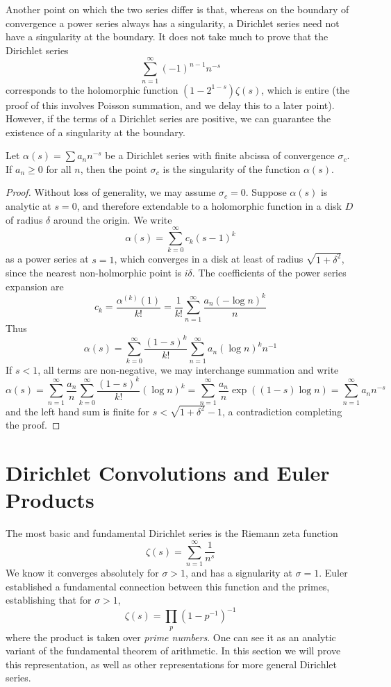 Another point on which the two series differ is that, whereas on the boundary of convergence a power series always has a singularity, a Dirichlet series need not have a singularity at the boundary. It does not take much to prove that the Dirichlet series
%
\[ \sum_{n = 1}^\infty (-1)^{n-1} n^{-s} \]
%
corresponds to the holomorphic function $(1 - 2^{1-s}) \zeta(s)$, which is entire (the proof of this involves Poisson summation, and we delay this to a later point). However, if the terms of a Dirichlet series are positive, we can guarantee the existence of a singularity at the boundary.

\begin{theorem}[Landau]
    Let $\alpha(s) = \sum a_n n^{-s}$ be a Dirichlet series with finite abcissa of convergence $\sigma_c$. If $a_n \geq 0$ for all $n$, then the point $\sigma_c$ is the singularity of the function $\alpha(s)$.
\end{theorem}
\begin{proof}
    Without loss of generality, we may assume $\sigma_c = 0$. Suppose $\alpha(s)$ is analytic at $s = 0$, and therefore extendable to a holomorphic function in a disk $D$ of radius $\delta$ around the origin. We write
    \[ \alpha(s) = \sum_{k = 0}^\infty c_k (s - 1)^k \]
    as a power series at $s = 1$, which converges in a disk at least of radius $\sqrt{1 + \delta^2}$, since the nearest non-holmorphic point is $i \delta$. The coefficients of the power series expansion are
    \[ c_k = \frac{\alpha^{(k)}(1)}{k!} = \frac{1}{k!} \sum_{n = 1}^\infty \frac{a_n (- \log n)^k}{n} \]
    Thus
    \[ \alpha(s) = \sum_{k = 0}^\infty \frac{(1 - s)^k}{k!} \sum_{n = 1}^\infty a_n (\log n)^k n^{-1} \]
    If $s < 1$, all terms are non-negative, we may interchange summation and write
    \[ \alpha(s) = \sum_{n = 1}^\infty \frac{a_n}{n} \sum_{k = 0}^\infty \frac{(1 - s)^k}{k!} (\log n)^k = \sum_{n = 1}^\infty \frac{a_n}{n} \exp((1 - s) \log n) = \sum_{n = 1}^\infty a_n n^{-s} \]
    and the left hand sum is finite for $s < \sqrt{1 + \delta^2} - 1$, a contradiction completing the proof.
\end{proof}

\section{Dirichlet Convolutions and Euler Products}

The most basic and fundamental Dirichlet series is the Riemann zeta function
%
\[ \zeta(s) = \sum_{n = 1}^\infty \frac{1}{n^s} \]
%
We know it converges absolutely for $\sigma > 1$, and has a signularity at $\sigma = 1$. Euler established a fundamental connection between this function and the primes, establishing that for $\sigma > 1$,
%
\[ \zeta(s) = \prod_p \left( 1 - p^{-1} \right)^{-1} \]
%
where the product is taken over {\it prime numbers}. One can see it as an analytic variant of the fundamental theorem of arithmetic. In this section we will prove this representation, as well as other representations for more general Dirichlet series.

